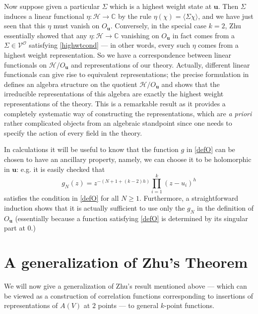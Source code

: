 \documentclass[a4paper,12pt]{article}
\newcommand{\C}{{\mathbb C}}
\newcommand{\uu}{{\mathbf u}}
\newcommand{\F}{{\mathcal H}}
\newcommand{\OO}{{\mathcal O}}
\newcommand{\V}{{\mathcal V}}
\newcommand{\IP}[1]{\langle#1\rangle}
\newcommand{\ti}[1]{\textit{#1}}
\begin{document}
Now suppose given a particular $\Sigma$ which is a highest weight state at $\uu$.  Then $\Sigma$ induces
a linear functional $\eta: \F \to \C$ by the rule
$\eta(\chi) = \IP{\Sigma \chi}$, and we have just seen that this $\eta$ must vanish
on $O_\uu$.  Conversely, in the special case $k=2$, Zhu essentially showed that 
any $\eta: \F \to \C$ vanishing on $O_\uu$
in fact comes from a $\Sigma \in \V^\OO$ satisfying \eqref{highwtcond} --- in other words, every such $\eta$ comes from a 
highest weight representation.
So we have a correspondence between linear functionals on $\F / O_\uu$ and representations of our theory.  Actually, different linear functionals
can give rise to equivalent representations; the precise formulation in \cite{Zhu}
defines an algebra structure on the quotient $\F / O_\uu$ and shows that the irreducible 
representations of this algebra are
exactly the highest weight representations of the theory.  This is a 
remarkable result as it provides a completely systematic way of constructing
the representations, which are \ti{a priori} rather complicated objects from an algebraic standpoint 
since one needs to specify the action of every field in the theory.

In calculations it will be useful to know that the function $g$ in \eqref{defO} can be chosen to
have an ancillary property, namely, we can choose it to be holomorphic in $\uu$:  e.g. it is easily checked
that
\begin{equation} \label{fchoice}
g_N(z) = z^{-(N+1+(k-2)h)} \prod_{i=1}^k (z-u_i)^h
\end{equation}
satisfies the condition in \eqref{defO} for all $N \ge 1$.  Furthermore, a straightforward induction shows that it is
actually sufficient to use only the $g_N$ in the definition of $O_\uu$ 
(essentially because a function satisfying \eqref{defO} is determined
by its singular part at $0$.)


\section{A generalization of Zhu's Theorem} \label{zhugen}

We will now give a generalization of Zhu's result mentioned above ---
which can be viewed as a construction of correlation functions
corresponding to insertions of representations of $A(V)$ at $2$ 
points --- to general $k$-point functions.
\end{document}
